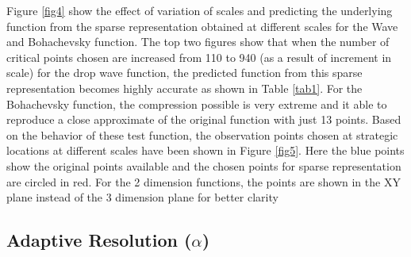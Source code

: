 \documentclass[procedia]{easychair}
\begin{document}
Figure \ref{fig4} show the effect of variation of scales and predicting the underlying function from the sparse representation obtained at different scales for the Wave and Bohachevsky function. The top two figures show that when the number of critical points chosen are increased from 110 to 940 (as a result of increment in scale) for the drop wave function, the predicted function from this sparse representation becomes highly accurate as shown in Table \ref{tab1}. For the Bohachevsky function, the compression possible is very extreme and it able to reproduce a close approximate of the original function with just 13 points. Based on the behavior of these test function, the observation points chosen at strategic locations at different scales have been shown in Figure \ref{fig5}. Here the blue points show the original points available and the chosen points for sparse representation are circled in red. For the 2 dimension functions, the points are shown in the XY plane instead of the 3 dimension plane for better clarity






\subsection{Adaptive Resolution ($\alpha$)}
\end{document}
